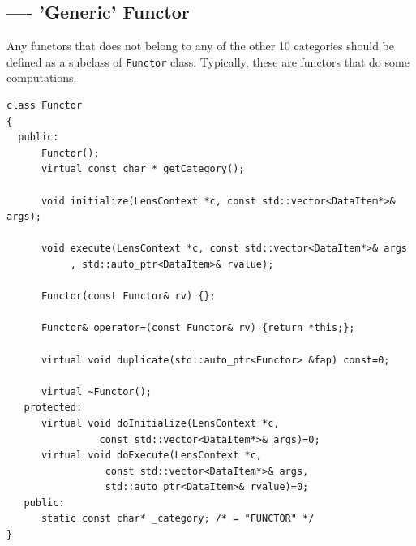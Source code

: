 

\subsection{---- 'Generic' Functor}
\label{sec:functor-generic}

Any functors that does not belong to any of the other 10 categories should be
defined as a subclass of \verb!Functor! class. Typically, these are functors
that do some computations.

\begin{Verbatim}
class Functor
{
  public:                                                                                                    
      Functor();                                                                                              
      virtual const char * getCategory();                                                                     
  
      void initialize(LensContext *c, const std::vector<DataItem*>& args);                                    
  
      void execute(LensContext *c, const std::vector<DataItem*>& args                                         
           , std::auto_ptr<DataItem>& rvalue);                                                                
  
      Functor(const Functor& rv) {};                                                                          
  
      Functor& operator=(const Functor& rv) {return *this;};                                                  
  
      virtual void duplicate(std::auto_ptr<Functor> &fap) const=0;                                            
  
      virtual ~Functor();                                                                                     
   protected:                                                                                                 
      virtual void doInitialize(LensContext *c,                                                               
                const std::vector<DataItem*>& args)=0;                                                        
      virtual void doExecute(LensContext *c,                                                                  
                 const std::vector<DataItem*>& args,                                                          
                 std::auto_ptr<DataItem>& rvalue)=0;                                                          
   public:                                                                                                    
      static const char* _category; /* = "FUNCTOR" */
}
\end{Verbatim}


